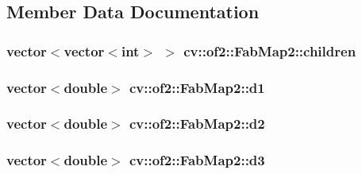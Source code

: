\subsection{Member Data Documentation}
\hypertarget{classcv_1_1of2_1_1FabMap2_a2d0a980ccb6950b3d2a3990be0891e54}{
\subsubsection[{children}]{\setlength{\rightskip}{0pt plus 5cm}vector$<$vector$<$int$>$ $>$ cv\-::of2\-::\-Fab\-Map2\-::children\hspace{0.3cm}{\ttfamily [protected]}}}\label{classcv_1_1of2_1_1FabMap2_a2d0a980ccb6950b3d2a3990be0891e54}
\hypertarget{classcv_1_1of2_1_1FabMap2_af4a5e362934e52c9e8e175994155a3cb}{
\subsubsection[{d1}]{\setlength{\rightskip}{0pt plus 5cm}vector$<$double$>$ cv\-::of2\-::\-Fab\-Map2\-::d1\hspace{0.3cm}{\ttfamily [protected]}}}\label{classcv_1_1of2_1_1FabMap2_af4a5e362934e52c9e8e175994155a3cb}
\hypertarget{classcv_1_1of2_1_1FabMap2_a8489e72b64325d3cf54f6c9df7c76b57}{
\subsubsection[{d2}]{\setlength{\rightskip}{0pt plus 5cm}vector$<$double$>$ cv\-::of2\-::\-Fab\-Map2\-::d2\hspace{0.3cm}{\ttfamily [protected]}}}\label{classcv_1_1of2_1_1FabMap2_a8489e72b64325d3cf54f6c9df7c76b57}
\hypertarget{classcv_1_1of2_1_1FabMap2_ae7a78b4ab2be95a3089e0096722835c3}{
\subsubsection[{d3}]{\setlength{\rightskip}{0pt plus 5cm}vector$<$double$>$ cv\-::of2\-::\-Fab\-Map2\-::d3\hspace{0.3cm}{\ttfamily [protected]}}}\label{classcv_1_1of2_1_1FabMap2_ae7a78b4ab2be95a3089e0096722835c3}
